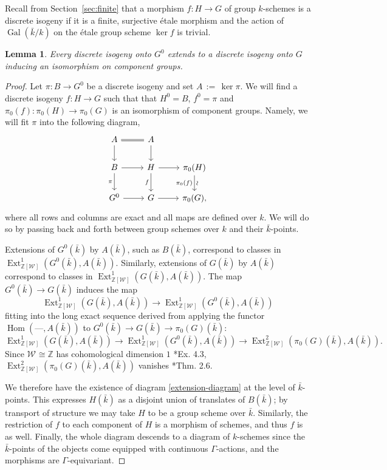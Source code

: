 \documentclass{amsart}
\theoremstyle{plain}
\newtheorem{lemma}[theorem]{Lemma}
\theoremstyle{definition}
\theoremstyle{remark}
\newcommand{\ZZ}{{\mathbb{Z}}}
\newcommand{\bFq}{\bar{k}}
\newcommand{\Fq}{k}
\newcommand{\Weil}[1]{\mathcal{W}_{#1}}
\DeclareMathOperator{\Gal}{Gal}
\DeclareMathOperator{\Hom}{Hom}
\DeclareMathOperator{\Ext}{Ext}
\newcommand{\ceq}{{\, :=\, }}
\begin{document}
Recall from Section~\ref{sec:finite} that
a morphism $f : H\to G$ of group $\Fq$-schemes is a discrete isogeny
if it is a finite, surjective \'etale morphism and
the action of $\Gal(\bFq/\Fq)$ on the \'etale group scheme $\ker f$ is trivial.

\begin{lemma}\label{lemma:ext}
Every discrete isogeny onto $G^0$ extends to a discrete
isogeny onto $G$ inducing an isomorphism on component groups.
\end{lemma}

\begin{proof}
Let $\pi: B \to G^0$ be a discrete isogeny and set $A \ceq \ker \pi$.
  We will find a discrete isogeny $f: H\to G$
  such that that $H^0 = B$, $f^0 =\pi$ and
  $\pi_0(f) : \pi_0(H)\to \pi_0(G)$ is an isomorphism of component
  groups.  Namely, we will fit $\pi$ into the following diagram,
  \begin{equation}\label{extension-diagram}
  \begin{tikzcd}
  A \arrow[equal]{r} \dar & A \dar \\
  B \rar \dar[swap]{\pi} & H \rar \dar[swap]{f} & \pi_0(H) \arrow{d}[below,rotate=90]{\sim}[swap]{\pi_0(f)} \\
  G^0 \rar & G \rar & \pi_0(G),
  \end{tikzcd}
  \end{equation}
  where all rows and columns are exact and all maps are defined over
  $\Fq$.  We will do so by passing back and forth between group
  schemes over $\Fq$ and their $\bFq$-points.

  Extensions of $G^0(\bFq)$ by $A(\bFq)$, such as $B(\bFq)$,
  correspond to classes in $\Ext^1_{\ZZ[\Weil{}]}(G^0(\bFq), A(\bFq))$.
  Similarly, extensions of $G(\bFq)$ by $A(\bFq)$ correspond to
  classes in $\Ext^1_{\ZZ[\Weil{}]}(G(\bFq), A(\bFq))$.  The map
  $G^0(\bFq) \to G(\bFq)$ induces the map
  \[
  \Ext^1_{\ZZ[\Weil{}]}(G(\bFq), A(\bFq)) \to \Ext^1_{\ZZ[\Weil{}]}(G^0(\bFq), A(\bFq))
  \]
  fitting into the long exact sequence derived from applying
  the functor $\Hom(\mbox{---}, A(\bFq))$ to $G^0(\bFq) \to G(\bFq) \to \pi_0(G)(\bFq)$:
  \[
  \Ext^1_{\ZZ[\Weil{}]}(G(\bFq), A(\bFq)) \to \Ext^1_{\ZZ[\Weil{}]}(G^0(\bFq), A(\bFq)) \to \Ext^2_{\ZZ[\Weil{}]}(\pi_0(G)(\bFq), A(\bFq)).
  \]
  Since $\Weil{} \cong \ZZ$ has cohomological dimension $1$ \cite{brown:CohomologyGrps}*{Ex. 4.3},
  $\Ext^2_{\ZZ[\Weil{}]}(\pi_0(G)(\bFq), A(\bFq))$ vanishes \cite{cartan-eilenberg:HomologicalAlgebra}*{Thm. 2.6}.

  We therefore have the existence of diagram \eqref{extension-diagram}
  at the level of $\bFq$-points.  This expresses $H(\bFq)$ as a
  disjoint union of translates of $B(\bFq)$; by transport of structure
  we may take $H$ to be a group scheme over $\bFq$.  Similarly, the
  restriction of $f$ to each component of $H$ is a morphism of
  schemes, and thus $f$ is as well.  Finally, the whole diagram
  descends to a diagram of $\Fq$-schemes since the $\bFq$-points of
  the objects come equipped with continuous $\Gamma$-actions, and the
  morphisms are $\Gamma$-equivariant.
\end{proof}
\end{document}
